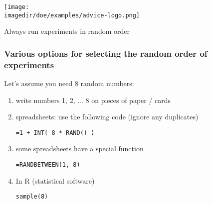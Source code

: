 {
\begin{frame}\frametitle{}
\end{frame}}

{
\begin{frame}\frametitle{}
\end{frame}}

{
\begin{frame}\frametitle{}
\end{frame}}

\begin{frame}\frametitle{}
	
     \texttt{[image: \\imagedir/doe/examples/advice-logo.png]}
	 \pause
	 \vspace{2cm}
	 \begin{center}
		\color{purple}
		 \Large Always run experiments
		 in random order
	 \end{center}
     \vspace{2cm}
\end{frame}

\begin{frame}\frametitle{Various options for selecting the random order of experiments}
	Let's assume you need 8 random numbers:
	\begin{enumerate}
		\item	write numbers 1, 2, ... 8 on pieces of paper / cards
		\item	spreadsheets: use the following code (ignore any duplicates)
			\begin{varblock}[5cm]{}
				\texttt{=1 + INT( 8 * RAND() )}
			\end{varblock}

		\item	some spreadsheets have a special function
			\begin{varblock}[5cm]{}
				\texttt{=RANDBETWEEN(1, 8)}
				\begin{center}
				\end{center}
			\end{varblock}

		\item	In R (statistical software)
			\begin{varblock}[5cm]{}
				\texttt{sample(8)}
			\end{varblock}
	\end{enumerate}
\end{frame}

